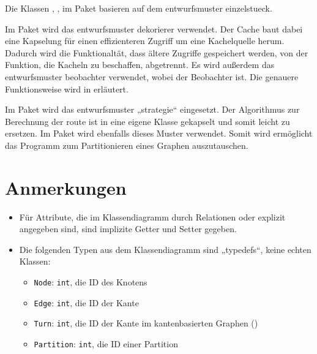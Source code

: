 \documentclass[a4paper, 11pt]{article}
\newcommand{\code}[1]{\texttt{#1}}
\begin{document}
Die Klassen , ,  im Paket  basieren auf dem \gls{entwurfsmuster} \gls{einzelstueck}. %

Im Paket  wird das \gls{entwurfsmuster} \gls{dekorierer} verwendet.
Der Cache baut dabei eine Kapselung für einen effizienteren Zugriff um eine Kachelquelle herum.
Dadurch wird die Funktionaltät, dass ältere Zugriffe gespeichert werden, von der Funktion, die Kacheln zu beschaffen, abgetrennt.
Es wird außerdem das \gls{entwurfsmuster} \gls{beobachter} verwendet, wobei  der Beobachter ist. Die genauere Funktionsweise wird in  erläutert.


Im Paket  wird das  \gls{entwurfsmuster} „\gls{strategie}“ eingesetzt.
Der Algorithmus zur Berechnung der \gls{route} ist in eine eigene Klasse  gekapselt und somit leicht zu ersetzen.  
Im Paket  wird ebenfalls dieses Muster verwendet. Somit wird ermöglicht das Programm zum Partitionieren eines Graphen auszutauschen.

\section{Anmerkungen}

\begin{itemize}
\item Für Attribute, die im Klassendiagramm durch Relationen oder explizit angegeben sind, sind implizite Getter und Setter gegeben.
\item Die folgenden Typen aus dem Klassendiagramm sind „typedefs“, keine echten Klassen:
  \begin{itemize}
  \item \code{Node}: \code{int}, die ID des Knotens
  \item \code{Edge}: \code{int}, die ID der Kante
  \item \code{Turn}: \code{int}, die ID der Kante im kantenbasierten Graphen ()
  \item \code{Partition}: \code{int}, die ID einer Partition
  \end{itemize}
\end{itemize}
\end{document}
